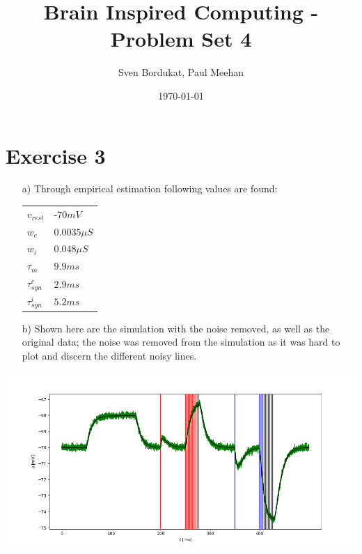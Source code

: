 \documentclass[a4paper]{article}
\begin{document}

\title{Brain Inspired Computing - Problem Set 4}

\author{Sven Bordukat, Paul Meehan}

\date{\today}

\maketitle


\section*{Exercise 3}
\begin{itemize}
    \item [a)] Through empirical estimation following values are found:\\
    \linebreak
    \begin{tabular}[h]{ll}
        $v_{rest}$&-$70mV$\\
        $w_e$&$0.0035\mu S$\\
        $w_i$&$0.048 \mu S$\\
        $\tau_m$&$9.9 ms$\\
        $\tau_{syn}^e$&$2.9ms$\\
        $\tau_{syn}^i$&$5.2ms$\\
    \end{tabular}
\item [b)] Shown here are the simulation with the noise removed, as well as
the original data; the noise was removed from the simulation as it was hard to
plot and discern the different noisy lines.
\end{itemize}
\includegraphics[width=\textwidth]{3.png}
\end{document}
